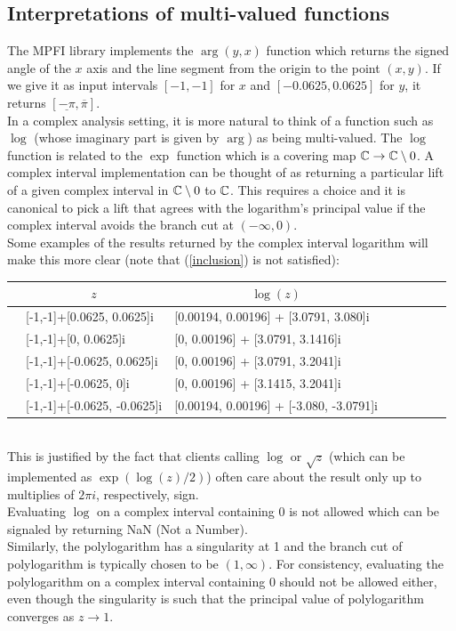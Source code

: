 \documentclass[utopia]{nmd/article}
\begin{document}
\subsection{Interpretations of multi-valued functions} The MPFI library implements the $\arg(y,x)$ function which returns the signed angle of the $x$ axis and the line segment from the origin to the point $(x,y)$. If we give it as input intervals $[-1,-1]$ for $x$ and $[-0.0625,0.0625]$ for $y$, it returns $[\underline{-\pi},\overline{\pi}].$\\
In a complex analysis setting, it is more natural to think of a function such as $\log$ (whose imaginary part is given by $\arg$) as being multi-valued. The $\log$ function is related to the $\exp$ function which is a covering map ${\mathbb C}\to{\mathbb C}\setminus 0$. A complex interval implementation can be thought of as returning a particular lift of a given complex interval in ${\mathbb C}\setminus 0$ to ${\mathbb C}$. This requires a choice and it is canonical to pick a lift that agrees with the logarithm's principal value if the complex interval avoids the branch cut at $(-\infty, 0)$.\\
Some examples of the results returned by the complex interval logarithm will make this more clear (note that (\ref{inclusion}) is not satisfied):\\
\begin{tabular}{ll|llllll}
&\multicolumn{1}{c|}{$z$} & \multicolumn{1}{c}{$\log(z)$}\\ \hline
&[-1,-1]+[\phantom{-}0.0625, \phantom{-}0.0625]i & [0.00194, 0.00196] + [\phantom{-}3.0791, \phantom{-}3.080\phantom{0}]i\\
&[-1,-1]+[\phantom{-}0\phantom{.0625}, \phantom{-}0.0625]i & [0\phantom{.00194}, 0.00196] + [\phantom{-}3.0791, \phantom{-}3.1416]i\\
&[-1,-1]+[-0.0625, \phantom{-}0.0625]i & [0\phantom{.00194}, 0.00196] + [\phantom{-}3.0791, \phantom{-}3.2041]i\\
&[-1,-1]+[-0.0625, \phantom{-}0\phantom{.0625}]i & [0\phantom{.00194}, 0.00196] + [\phantom{-}3.1415, \phantom{-}3.2041]i\\
&[-1,-1]+[-0.0625, -0.0625]i & [0.00194, 0.00196] + [-3.080\phantom{0}, -3.0791]i\\
\end{tabular} \medskip \\
This is justified by the fact that clients calling $\log$ or $\sqrt{z}$ (which can be implemented as $\exp(\log(z)/2)$) often care about the result only up to multiplies of $2\pi i$, respectively, sign.\\ 
Evaluating $\log$ on a complex interval containing $0$ is not allowed which can be signaled by returning NaN (Not a Number).\\
Similarly, the polylogarithm has a singularity at 1 and the branch cut of polylogarithm is typically chosen to be $(1,\infty)$. For consistency, evaluating the polylogarithm on a complex interval containing $0$ should not be allowed either, even though the singularity is such that the principal value of polylogarithm converges as $z\to 1$.
\end{document}
